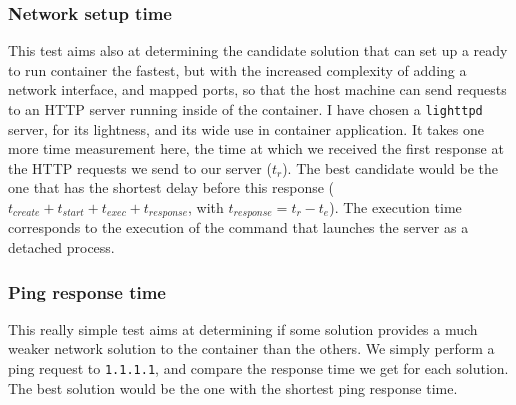 \subsubsection{Network setup time}
This test aims also at determining the candidate solution that can set up a ready to run container the fastest, but with the increased complexity of adding a network interface, and mapped ports, so that the host machine can send requests to an HTTP server running inside of the container.  I have chosen a \texttt{lighttpd} server, for its lightness, and its wide use in container application.  It takes one more time measurement here, the time at which we received the first response at the HTTP requests we send to our server ($t_r$).  The best candidate would be the one that has the shortest delay before this response ($t_{create} + t_{start} + t_{exec} + t_{response}$, with $t_{response}=t_r - t_e$).  The execution time corresponds to the execution of the command that launches the server as a detached process.

\subsubsection{Ping response time}
This really simple test aims at determining if some solution provides a much weaker network solution to the container than the others.  We simply perform a ping request to \texttt{1.1.1.1}, and compare the response time we get for each solution.  The best solution would be the one with the shortest ping response time.
